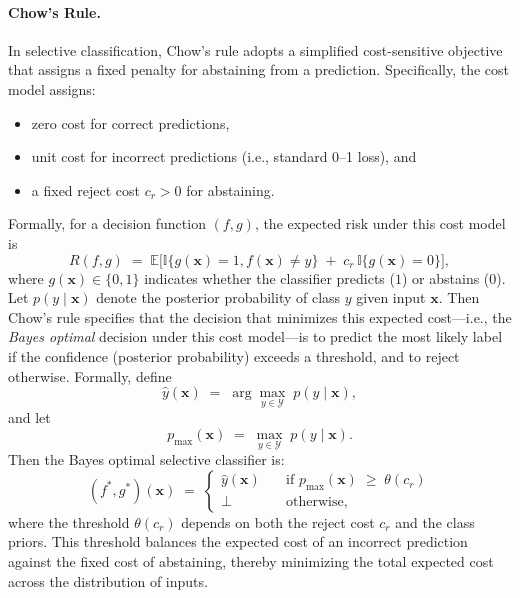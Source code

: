 \paragraph{Chow's Rule.}
In selective classification, Chow’s rule adopts a simplified cost-sensitive objective that assigns a fixed penalty for abstaining from a prediction. Specifically, the cost model assigns:
\begin{itemize}
  \item zero cost for correct predictions,
  \item unit cost for incorrect predictions (i.e., standard 0–1 loss), and
  \item a fixed reject cost $c_r > 0$ for abstaining.
\end{itemize}
Formally, for a decision function $(f,g)$, the expected risk under this cost model is
\begin{equation}
R(f,g) \;=\; \mathbb{E} \big[ \mathbb{I}\{g(\bm{x}) = 1, f(\bm{x}) \neq y\} \;+\; c_r \,\mathbb{I}\{g(\bm{x}) = 0\} \big],
\end{equation}
where $g(\bm{x}) \in \{0,1\}$ indicates whether the classifier predicts ($1$) or abstains ($0$).  
Let $p(y \mid \bm{x})$ denote the posterior probability of class $y$ given input $\bm{x}$. Then Chow's rule \citep{chow1957optimum} specifies that the decision that minimizes this expected cost—i.e., the \emph{Bayes optimal} decision under this cost model—is to predict the most likely label if the confidence (posterior probability) exceeds a threshold, and to reject otherwise. Formally, define
\begin{equation}
\hat{y}(\bm{x}) \;=\; \arg\max_{y\in\mathcal{Y}} \;p(y \mid \bm{x}),
\end{equation}
and let 
\begin{equation}
p_{\max}(\bm{x}) \;=\; \max_{y\in\mathcal{Y}} \; p(y \mid \bm{x}).
\end{equation}
Then the Bayes optimal selective classifier is:
\begin{equation}
(f^\ast, g^\ast)(\bm{x}) \;=\; \begin{cases}
\hat{y}(\bm{x}) \quad &\text{if } p_{\max}(\bm{x}) \;\geq\; \theta(c_r) \\
\bot \quad &\text{otherwise},
\end{cases}
\end{equation}
where the threshold $\theta(c_r)$ depends on both the reject cost $c_r$ and the class priors. This threshold balances the expected cost of an incorrect prediction against the fixed cost of abstaining, thereby minimizing the total expected cost across the distribution of inputs.


